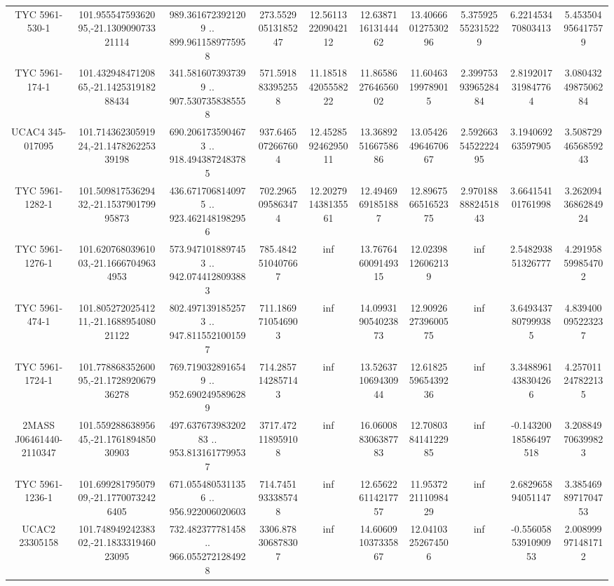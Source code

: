 \begin{table}
\begin{tabular}{cccccccccc}
TYC 5961-530-1 & 101.95554759362095,-21.130909073321114 & 989.3616723921209 .. 899.9611589775958 & 273.55290513185247 & 12.561132209042112 & 12.638711613144462 & 13.406660127530296 & 5.375925552315229 & 6.221453470803413 & 5.453504956417579 \\
TYC 5961-174-1 & 101.43294847120865,-21.142531918288434 & 341.5816073937399 .. 907.5307358385558 & 571.5918833952558 & 11.185184205558222 & 11.865862764656002 & 11.60463199789015 & 2.3997539396528484 & 2.8192017319847764 & 3.0804324987506284 \\
UCAC4 345-017095 & 101.71436230591924,-21.147826225339198 & 690.2061735904673 .. 918.4943872483785 & 937.6465072667604 & 12.452859246295011 & 13.368925166758686 & 13.054264964670667 & 2.5926635452222495 & 3.194069263597905 & 3.5087294656859243 \\
TYC 5961-1282-1 & 101.50981753629432,-21.153790179995873 & 436.6717068140975 .. 923.4621481982956 & 702.2965095863474 & 12.202791438135561 & 12.49469691851887 & 12.896756651652375 & 2.9701888882451843 & 3.664154101761998 & 3.2620943686284924 \\
TYC 5961-1276-1 & 101.62076803961003,-21.16667049634953 & 573.9471018897453 .. 942.0744128093883 & 785.4842510407667 & inf & 13.767646009149315 & 12.02398126062139 & inf & 2.548293851326777 & 4.291958599854702 \\
TYC 5961-474-1 & 101.80527202541211,-21.168895408021122 & 802.4971391852573 .. 947.8115521001597 & 711.1869710546903 & inf & 14.099319054023873 & 12.909262739600575 & inf & 3.6493437807999385 & 4.839400095223237 \\
TYC 5961-1724-1 & 101.77886835260095,-21.172892067936278 & 769.7190328916549 .. 952.6902495896289 & 714.2857142857143 & inf & 13.526371069430944 & 12.618255965439236 & inf & 3.3488961438304266 & 4.257011247822135 \\
2MASS J06461440-2110347 & 101.55928863895645,-21.176189485030903 & 497.63767398320283 .. 953.8131617799537 & 3717.472118959108 & inf & 16.060088306387783 & 12.708038414122985 & inf & -0.14320018586497518 & 3.208849706399823 \\
TYC 5961-1236-1 & 101.69928179507909,-21.17700732426405 & 671.0554805311356 .. 956.922006020603 & 714.7451933385748 & inf & 12.656226114217757 & 11.953722111098429 & inf & 2.682965894051147 & 3.3854698971704753 \\
UCAC2  23305158 & 101.74894924238302,-21.183331946023095 & 732.482377781458 .. 966.0552721284928 & 3306.878306878307 & inf & 14.606091037335867 & 12.04103252674506 & inf & -0.5560585391090953 & 2.008999971481712 \\
\end{tabular}
\end{table}
